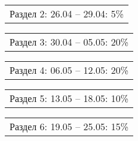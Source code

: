 \documentclass[12pt, А4, twoside]{article}
\begin{document}
\begin{FlushLeft}
    \vspace{-0.1 cm}

    \begin{tabular}{p{17.25cm}}
        \hspace{0.3cm} \textsf{Раздел 2:} \hspace{2.54cm} \textsf{ 26.04 {--} 29.04:} \hspace{0.5cm} \textsf{5\%} \vspace{0pt} \hline \\
    \end{tabular}

    \vspace{-0.1 cm}

    \begin{tabular}{p{17.25cm}}
        \hspace{0.3cm} \textsf{Раздел 3:} \hspace{2.54cm} \textsf{ 30.04 {--} 05.05:} \hspace{0.5cm} \textsf{20\%} \vspace{0pt} \hline \\
    \end{tabular}

    \vspace{-0.1 cm}

    \begin{tabular}{p{17.25cm}}
        \hspace{0.3cm} \textsf{Раздел 4:} \hspace{2.54cm} \textsf{ 06.05 {--} 12.05:} \hspace{0.5cm} \textsf{20\%} \vspace{0pt} \hline \\
    \end{tabular}

    \vspace{-0.1 cm}

    \begin{tabular}{p{17.25cm}}
        \hspace{0.3cm} \textsf{Раздел 5:} \hspace{2.54cm} \textsf{ 13.05 {--} 18.05:} \hspace{0.5cm} \textsf{10\%} \vspace{0pt} \hline \\
    \end{tabular}

    \vspace{-0.1 cm}

    \begin{tabular}{p{17.25cm}}
        \hspace{0.3cm} \textsf{Раздел 6:} \hspace{2.54cm} \textsf{ 19.05 {--} 25.05:} \hspace{0.5cm} \textsf{15\%} \vspace{0pt} \hline \\
    \end{tabular}


\end{FlushLeft}
\end{document}
